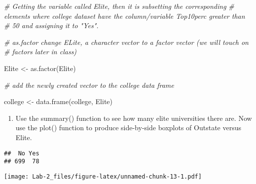 \documentclass[
]{article}
\newenvironment{Shaded}{\begin{snugshade}}{\end{snugshade}}
\newcommand{\AttributeTok}[1]{\textcolor[rgb]{0.77,0.63,0.00}{#1}}
\newcommand{\CommentTok}[1]{\textcolor[rgb]{0.56,0.35,0.01}{\textit{#1}}}
\newcommand{\FunctionTok}[1]{\textcolor[rgb]{0.00,0.00,0.00}{#1}}
\newcommand{\NormalTok}[1]{#1}
\newcommand{\OtherTok}[1]{\textcolor[rgb]{0.56,0.35,0.01}{#1}}
\newcommand{\SpecialCharTok}[1]{\textcolor[rgb]{0.00,0.00,0.00}{#1}}
\providecommand{\tightlist}{%
  \setlength{\itemsep}{0pt}\setlength{\parskip}{0pt}}
\begin{document}
\begin{Shaded}
\begin{Highlighting}[]
\CommentTok{\# Getting the variable called \textasciigrave{}Elite\textasciigrave{}, then it is subsetting the corresponding }
\CommentTok{\# elements where college dataset have the column/variable Top10perc greater than }
\CommentTok{\# 50 and assigning it to "Yes".}


\CommentTok{\# as.factor change ELite, a character vector to a factor vector (we will touch on }
\CommentTok{\# factors later in class) }

\NormalTok{Elite }\OtherTok{\textless{}{-}} \FunctionTok{as.factor}\NormalTok{(Elite)}

\CommentTok{\# add the newly created vector to the college data frame}

\NormalTok{college }\OtherTok{\textless{}{-}} \FunctionTok{data.frame}\NormalTok{(college, Elite)}
\end{Highlighting}
\end{Shaded}

\begin{enumerate}
\def\labelenumi{\roman{enumi}.}
\setcounter{enumi}{3}
\tightlist
\item
  Use the summary() function to see how many elite universities there
  are. Now use the plot() function to produce side-by-side boxplots of
  Outstate versus Elite.
\end{enumerate}

\begin{Shaded}
\end{Shaded}

\begin{verbatim}
##  No Yes 
## 699  78
\end{verbatim}

\begin{Shaded}
\end{Shaded}

\texttt{[image: Lab-2\_files/figure-latex/unnamed-chunk-13-1.pdf]}
\end{document}
